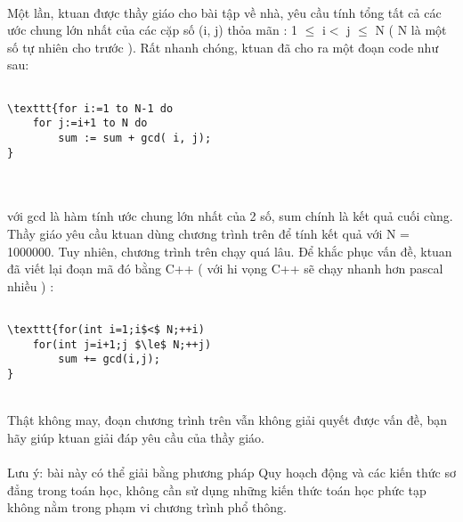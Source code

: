  

Một lần, ktuan được thầy giáo cho bài tập về nhà, yêu cầu tính tổng tất cả các ước chung lớn nhất của các cặp số (i, j) thỏa mãn : 1 $\le$ i$<$ j $\le$ N ( N là một số tự nhiên cho trước ). Rất nhanh chóng, ktuan đã cho ra một đoạn code như sau:
\begin{verbatim}

\texttt{for i:=1 to N-1 do
    for j:=i+1 to N do
        sum := sum + gcd( i, j);
}\end{verbatim}


\\
\\với gcd là hàm tính ước chung lớn nhất của 2 số, sum chính là kết quả cuối cùng.
\\Thầy giáo yêu cầu ktuan dùng chương trình trên để tính kết quả với N = 1000000. Tuy nhiên, chương trình trên chạy quá lâu. Để khắc phục vấn đề, ktuan đã viết lại đoạn mã đó bằng C++ ( với hi vọng C++ sẽ chạy nhanh hơn pascal nhiều ) :
\begin{verbatim}

\texttt{for(int i=1;i$<$ N;++i)
    for(int j=i+1;j $\le$ N;++j)
        sum += gcd(i,j);
}\end{verbatim}


\\Thật không may, đoạn chương trình trên vẫn không giải quyết được vấn đề, bạn hãy giúp ktuan giải đáp yêu cầu của thầy giáo.
\\
\\Lưu ý: bài này có thể giải bằng phương pháp Quy hoạch động và các kiến thức sơ đẳng trong toán học, không cần sử dụng những kiến thức toán học phức tạp không nằm trong phạm vi chương trình phổ thông.

\